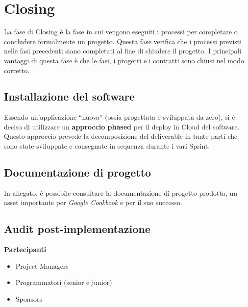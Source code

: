 \chapter{Closing}

La fase di Closing è la fase in cui vengono eseguiti i processi per completare o concludere formalmente un progetto.
Questa fase verifica che i processi previsti nelle fasi precedenti siano completati al fine di chiudere il progetto.
I principali vantaggi di questa fase è che le fasi, i progetti e i contratti sono chiusi nel modo corretto.

\section{Installazione del software}

Essendo un'applicazione ``nuova'' (ossia progettata e sviluppata da zero), si è deciso di utilizzare un 
\textbf{approccio phased} per il deploy in Cloud del software. Questo approccio prevede la decomposizione 
del deliverable in tante parti che sono state sviluppate e consegnate in sequenza durante i vari Sprint. 

\section{Documentazione di progetto}

In allegato, è possibile consultare la documentazione di progetto prodotta, un asset importante per 
\textit{Google Cookbook} e per il suo successo.

\section{Audit post-implementazione}

\textbf{Partecipanti}
\begin{itemize}
    \item Project Managers
    \item Programmatori (senior e junior)
    \item Sponsors
\end{itemize}

